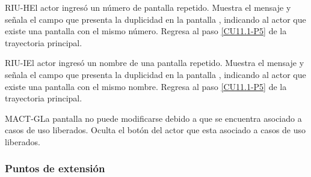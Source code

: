 	\begin{UCtrayectoriaA}{RIU-H}{El actor ingresó un número de pantalla repetido.}
		\UCpaso[\UCsist] Muestra el mensaje  y señala el campo que presenta la duplicidad en la pantalla , indicando al actor que existe una pantalla con el mismo número.
		\UCpaso Regresa al paso \ref{CU11.1-P5} de la trayectoria principal.
	\end{UCtrayectoriaA}

	\begin{UCtrayectoriaA}{RIU-I}{El actor ingresó un nombre de una pantalla repetido.}
		\UCpaso[\UCsist] Muestra el mensaje  y señala el campo que presenta la duplicidad en la pantalla , indicando al actor que existe una pantalla con el mismo nombre.
		\UCpaso Regresa al paso \ref{CU11.1-P5} de la trayectoria principal.
	\end{UCtrayectoriaA}

	\begin{UCtrayectoriaA}{MACT-G}{La pantalla no puede modificarse debido a que se encuentra asociado a casos de uso liberados.}
		\UCpaso[\UCsist] Oculta el botón \editar del actor que esta asociado a casos de uso liberados.
	\end{UCtrayectoriaA}


\subsubsection{Puntos de extensión}

